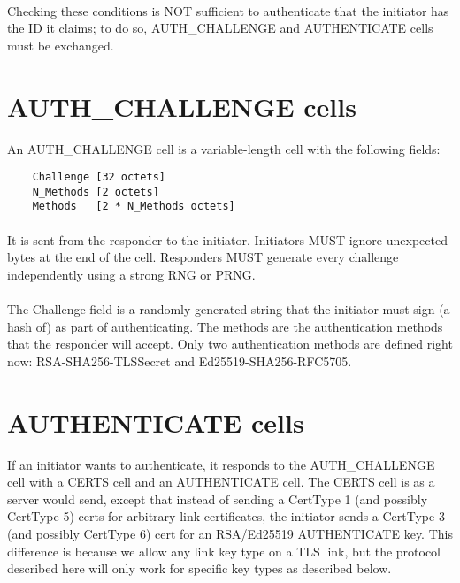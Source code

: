 \paragraph{}
Checking these conditions is NOT sufficient to authenticate that the
initiator has the ID it claims; to do so, AUTH\_CHALLENGE and AUTHENTICATE cells
must be exchanged.

\section{AUTH\_CHALLENGE cells}

An AUTH\_CHALLENGE cell is a variable-length cell with the following
fields:

\begin{verbatim}
    Challenge [32 octets]
    N_Methods [2 octets]
    Methods   [2 * N_Methods octets]
\end{verbatim}

\paragraph{}
It is sent from the responder to the initiator. Initiators MUST
ignore unexpected bytes at the end of the cell. Responders MUST
generate every challenge independently using a strong RNG or PRNG.

\paragraph{}
The Challenge field is a randomly generated string that the
initiator must sign (a hash of) as part of authenticating. The
methods are the authentication methods that the responder will
accept. Only two authentication methods are defined right now:
RSA-SHA256-TLSSecret and Ed25519-SHA256-RFC5705.

\section{AUTHENTICATE cells}

If an initiator wants to authenticate, it responds to the
AUTH\_CHALLENGE cell with a CERTS cell and an AUTHENTICATE cell.
The CERTS cell is as a server would send, except that instead of
sending a CertType 1 (and possibly CertType 5) certs for arbitrary link
certificates, the initiator sends a CertType 3 (and possibly
CertType 6) cert for an RSA/Ed25519 AUTHENTICATE key.
This difference is because we allow any link key type on a TLS
link, but the protocol described here will only work for specific key
types as described below.

